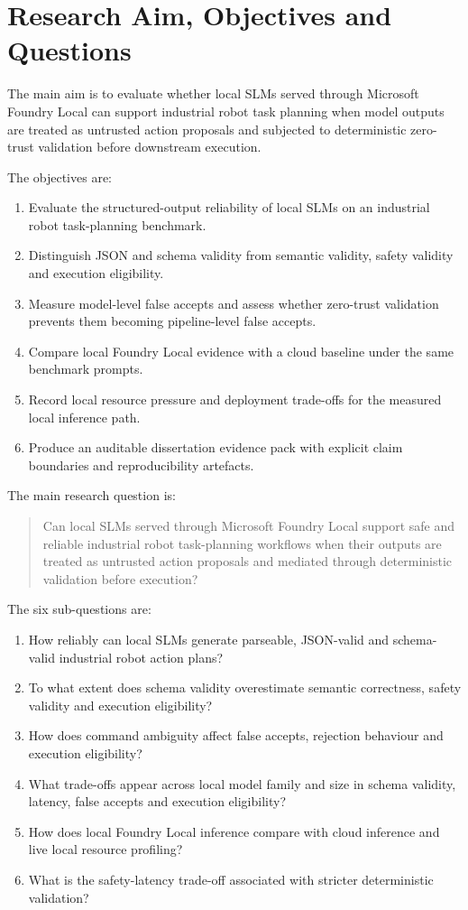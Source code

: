 \section{Research Aim, Objectives and Questions}
\label{sec:research_aims_questions}

The main aim is to evaluate whether local SLMs served through Microsoft Foundry Local can support industrial robot task planning when model outputs are treated as untrusted action proposals and subjected to deterministic zero-trust validation before downstream execution.

The objectives are:
\begin{enumerate}
    \item Evaluate the structured-output reliability of local SLMs on an industrial robot task-planning benchmark.
    \item Distinguish JSON and schema validity from semantic validity, safety validity and execution eligibility.
    \item Measure model-level false accepts and assess whether zero-trust validation prevents them becoming pipeline-level false accepts.
    \item Compare local Foundry Local evidence with a cloud baseline under the same benchmark prompts.
    \item Record local resource pressure and deployment trade-offs for the measured local inference path.
    \item Produce an auditable dissertation evidence pack with explicit claim boundaries and reproducibility artefacts.
\end{enumerate}

The main research question is:

\begin{quote}
Can local SLMs served through Microsoft Foundry Local support safe and reliable industrial robot task-planning workflows when their outputs are treated as untrusted action proposals and mediated through deterministic validation before execution?
\end{quote}

The six sub-questions are:
\begin{enumerate}
    \item How reliably can local SLMs generate parseable, JSON-valid and schema-valid industrial robot action plans?
    \item To what extent does schema validity overestimate semantic correctness, safety validity and execution eligibility?
    \item How does command ambiguity affect false accepts, rejection behaviour and execution eligibility?
    \item What trade-offs appear across local model family and size in schema validity, latency, false accepts and execution eligibility?
    \item How does local Foundry Local inference compare with cloud inference and live local resource profiling?
    \item What is the safety-latency trade-off associated with stricter deterministic validation?
\end{enumerate}


